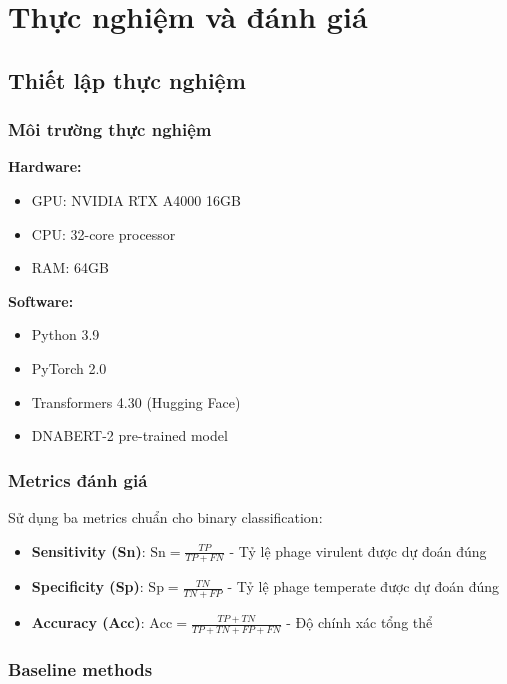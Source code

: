 \chapter{Thực nghiệm và đánh giá}
\label{chap:experiments}

\section{Thiết lập thực nghiệm}

\subsection{Môi trường thực nghiệm}

\textbf{Hardware:}
\begin{itemize}
    \item GPU: NVIDIA RTX A4000 16GB
    \item CPU: 32-core processor
    \item RAM: 64GB
\end{itemize}

\textbf{Software:}
\begin{itemize}
    \item Python 3.9
    \item PyTorch 2.0
    \item Transformers 4.30 (Hugging Face)
    \item DNABERT-2 pre-trained model
\end{itemize}

\subsection{Metrics đánh giá}

Sử dụng ba metrics chuẩn cho binary classification:

\begin{itemize}
    \item \textbf{Sensitivity (Sn)}: $\text{Sn} = \frac{TP}{TP + FN}$ - Tỷ lệ phage virulent được dự đoán đúng
    \item \textbf{Specificity (Sp)}: $\text{Sp} = \frac{TN}{TN + FP}$ - Tỷ lệ phage temperate được dự đoán đúng
    \item \textbf{Accuracy (Acc)}: $\text{Acc} = \frac{TP + TN}{TP + TN + FP + FN}$ - Độ chính xác tổng thể
\end{itemize}

\subsection{Baseline methods}

